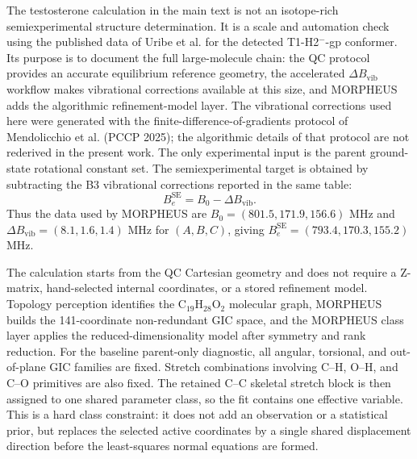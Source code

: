 \documentclass[12pt]{article}
\begin{document}
The testosterone calculation in the main text is not an isotope-rich
semiexperimental structure determination. It is a scale and automation check
using the published data of Uribe et al. for the detected T1-H2$^{-}$-gp
conformer. Its purpose is to document the full large-molecule chain: the
QC protocol provides an accurate equilibrium reference geometry, the
accelerated $\Delta B_\mathrm{vib}$ workflow makes vibrational corrections
available at this size, and MORPHEUS adds the algorithmic refinement-model layer.
The vibrational corrections used here were generated with the
finite-difference-of-gradients protocol of Mendolicchio et al. (PCCP 2025);
the algorithmic details of that protocol are not rederived in the present work.
The only experimental input is the parent ground-state rotational constant
set. The semiexperimental target is obtained by subtracting the B3 vibrational
corrections reported in the same table:
\[
B_e^\mathrm{SE}=B_0-\Delta B_\mathrm{vib}.
\]
Thus the data used by MORPHEUS are $B_0=(801.5,171.9,156.6)$ MHz and
$\Delta B_\mathrm{vib}=(8.1,1.6,1.4)$ MHz for $(A,B,C)$, giving
$B_e^\mathrm{SE}=(793.4,170.3,155.2)$ MHz.

The calculation starts from the QC Cartesian geometry and does not require
a Z-matrix, hand-selected internal coordinates, or a stored refinement model.
Topology perception identifies the C$_{19}$H$_{28}$O$_2$ molecular graph,
MORPHEUS builds the 141-coordinate non-redundant GIC space, and the
MORPHEUS class layer applies the reduced-dimensionality model after symmetry
and rank reduction. For the baseline parent-only diagnostic, all angular,
torsional, and out-of-plane GIC families are fixed. Stretch combinations
involving C--H, O--H, and C--O primitives are also fixed. The retained C--C
skeletal stretch block is then assigned to one shared parameter class, so the
fit contains one effective variable. This is a hard class constraint: it does
not add an observation or a statistical prior, but replaces the selected active
coordinates by a single shared displacement direction before the least-squares
normal equations are formed.
\end{document}
